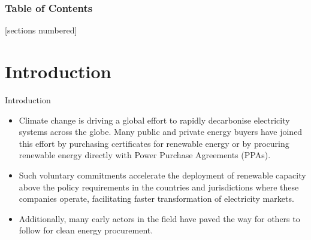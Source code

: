 \begin{frame}
  \frametitle{Table of Contents}
  [sections numbered]
  \tableofcontents[hideallsubsections]
\end{frame}



\section{Introduction}


\begin{frame}{Introduction}

  \centering
    \begin{itemize}
    \item Climate change is driving a global effort to rapidly decarbonise 
    electricity systems across the globe. 
    Many public and private energy buyers have joined this effort 
    by purchasing certificates for renewable energy or
    by procuring renewable energy directly with Power Purchase Agreements (PPAs).
    \item Such \alert{voluntary commitments accelerate the deployment of renewable 
    capacity} above the policy requirements in the countries and jurisdictions
    where these companies operate, facilitating faster
    transformation of electricity markets.
    \item Additionally, many early actors in the field have paved the way for others to follow 
     for clean energy procurement.
    \end{itemize}
  
\end{frame}



